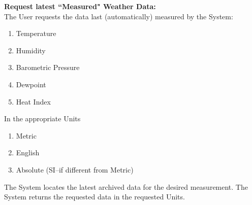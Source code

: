 \documentclass[letterpaper]{article}
\begin{document}
\noindent
\textbf{Request latest ``Measured" Weather Data:  }\\
The User requests the data last (automatically) measured by the
System:
\begin{enumerate}
\item Temperature
\item Humidity
\item Barometric Pressure
\item Dewpoint
\item Heat Index
\end{enumerate}
In the appropriate Units
\begin{enumerate}
\item Metric
\item English
\item Absolute (SI--if different from Metric)
\end{enumerate}
The System locates the latest archived data for the desired
measurement.  The System returns the requested data in the requested
Units.
\end{document}
